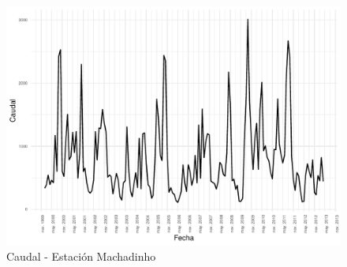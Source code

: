 \documentclass[12pt,oneside]{book}\usepackage[]{graphicx}\usepackage[]{color}
\makeatletter
\def\maxwidth{ %
  \ifdim\Gin@nat@width>\linewidth
    \linewidth
  \else
    \Gin@nat@width
  \fi
}
\newenvironment{knitrout}{}{} %
\theoremstyle{definition} %
\makeatother
\begin{document}
\begin{knitrout}
\color{fgcolor}\begin{figure}[H]

{\centering \includegraphics[width=\maxwidth]{figure/unnamed-chunk-21-1} 

}

\caption{\label{fig:sarimax_serie} Caudal - Estación Machadinho}\label{fig:unnamed-chunk-21}
\end{figure}


\end{knitrout}
\end{document}
